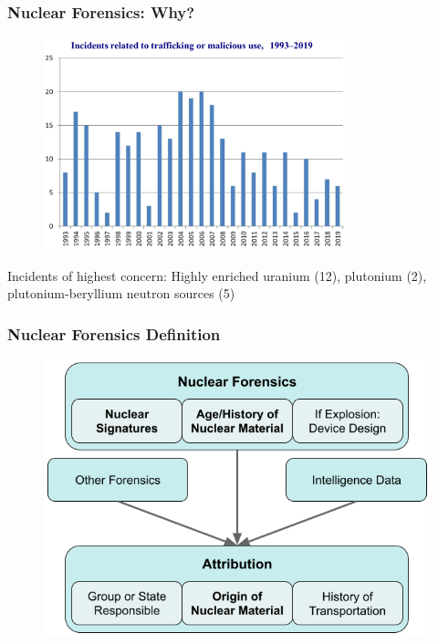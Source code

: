 
\begin{frame}
  \frametitle{Nuclear Forensics: Why?}
  \begin{figure}
    \centering
    \includegraphics[width=0.78\textwidth]{./figures/nucleartrafficking.png}
  \end{figure}
  Incidents of highest concern: Highly enriched uranium (12), plutonium (2), 
  plutonium-beryllium neutron sources (5) \cite{itdb}
\end{frame}

\begin{frame}
  \frametitle{Nuclear Forensics Definition}
  \begin{figure}
    \centering
    \includegraphics[height=0.85\textheight]{./figures/nf_define.png}
  \end{figure}
\end{frame}

